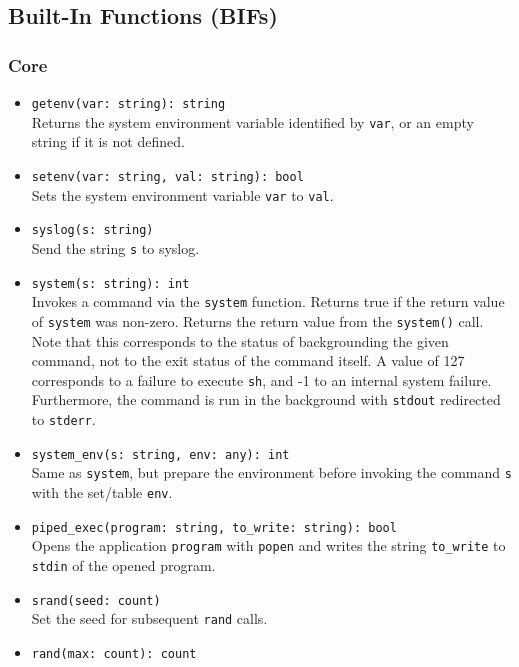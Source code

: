 \documentclass[10pt,landscape]{article}
\begin{document}
\begin{multicols*}{2}
\subsection*{Built-In Functions (BIFs)}
\linespread{0.9}

\subsubsection*{Core}

\begin{itemize}
  \item \verb|getenv(var: string): string|\\
    Returns the system environment variable identified by \verb|var|, or an
    empty string if it is not defined.
  \item \verb|setenv(var: string, val: string): bool|\\
    Sets the system environment variable \verb|var| to \verb|val|.
  \item \verb|syslog(s: string)|\\
    Send the string \verb|s| to syslog.
  \item \verb|system(s: string): int|\\
    Invokes a command via the \texttt{system} function.
    Returns true if the return value of \texttt{system} was non-zero.
    Returns the return value from the \texttt{system()} call. Note that this
    corresponds to the status of backgrounding the given command, not to the
    exit status of the command itself. A value of 127 corresponds to a failure
    to execute \verb|sh|, and -1 to an internal system failure. Furthermore,
    the command is run in the background with \verb|stdout| redirected to
    \verb|stderr|.
  \item \verb|system_env(s: string, env: any): int|\\
    Same as \verb|system|, but prepare the environment before invoking the
    command \verb|s| with the set/table \verb|env|.
  \item \verb|piped_exec(program: string, to_write: string): bool|\\
    Opens the application \verb|program| with \verb|popen| and writes the
    string \verb|to_write| to \texttt{stdin} of the opened program. 
  \item \verb|srand(seed: count)|\\
    Set the seed for subsequent \verb|rand| calls.
  \item \verb|rand(max: count): count|\\

\end{itemize}
\end{multicols*}
\end{document}
